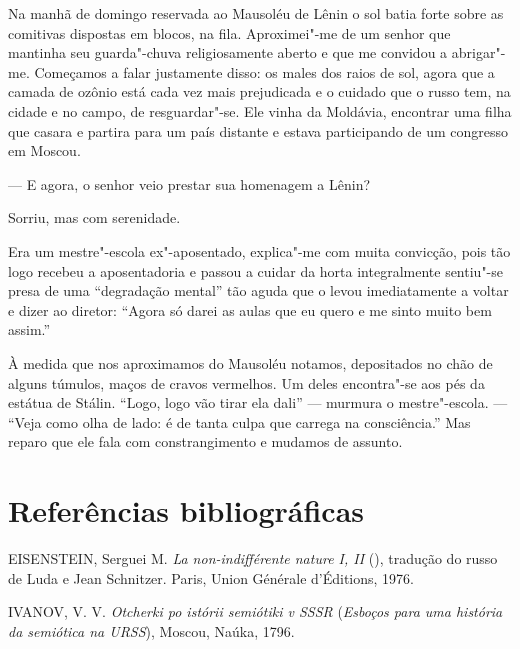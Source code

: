 Na manhã de domingo reservada ao Mausoléu de Lênin o sol batia forte
sobre as comitivas dispostas em blocos, na fila. Aproximei"-me de um
senhor que mantinha seu guarda"-chuva religiosamente aberto e que me
convidou a abrigar"-me. Começamos a falar justamente disso: os males dos
raios de sol, agora que a camada de ozônio está cada vez mais
prejudicada e o cuidado que o russo tem, na cidade e no campo, de
resguardar"-se. Ele vinha da Moldávia, encontrar uma filha que casara e
partira para um país distante e estava participando de um congresso em
Moscou.

--- E agora, o senhor veio prestar sua homenagem a Lênin?

Sorriu, mas com serenidade.

Era um mestre"-escola ex"-aposentado, explica"-me com muita convicção, pois
tão logo recebeu a aposentadoria e passou a cuidar da horta
integralmente sentiu"-se presa de uma ``degradação mental'' tão aguda que
o levou imediatamente a voltar e dizer ao diretor: ``Agora só darei as
aulas que eu quero e me sinto muito bem assim.''

À medida que nos aproximamos do Mausoléu notamos, depositados no chão de
alguns túmulos, maços de cravos vermelhos. Um deles encontra"-se aos pés
da estátua de Stálin. ``Logo, logo vão tirar ela dali'' --- murmura o
mestre"-escola. --- ``Veja como olha de lado: é de tanta culpa que carrega
na consciência.'' Mas reparo que ele fala com constrangimento e mudamos
de assunto.

\section{Referências bibliográficas}

EISENSTEIN, Serguei M. \emph{La non-indifférente nature I, II} (),
tradução do russo de Luda e Jean Schnitzer. Paris, Union Générale
d'Éditions, 1976.


IVANOV, V. V. \emph{Otcherki po istórii semiótiki v SSSR} (\emph{Esboços
para uma história da semiótica na URSS}), Moscou, Naúka, 1796.

